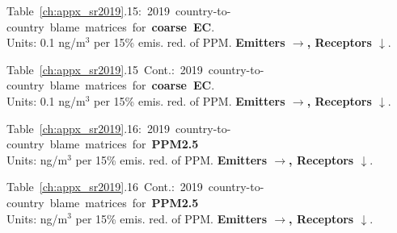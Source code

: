 \footnotesize{\mbox{Table \ref{ch:appx_sr2019}.15: 2019
    country-to-country blame matrices for \textbf{coarse
      EC}.}\\ Units: 0.1 ng/m$^3$ per 15\% emis. red. of PPM. \textbf{Emitters $\rightarrow$, Receptors $\downarrow$}. }\\[\baselineskip]\enlargethispage{\myenlarge} \hspace{-0.5cm} 
\centerline{}\clearpage
\footnotesize{\mbox{Table \ref{ch:appx_sr2019}.15 Cont.: 2019
    country-to-country blame matrices for \textbf{coarse
      EC}.}\\ Units: 0.1 ng/m$^3$ per 15\% emis. red. of PPM. \textbf{Emitters $\rightarrow$, Receptors $\downarrow$}. }\\[\baselineskip]\enlargethispage{\myenlarge} \hspace{-0.5cm} 
\centerline{}\clearpage



\footnotesize{\mbox{Table \ref{ch:appx_sr2019}.16: 2019 country-to-country blame matrices for \textbf{PPM2.5}}\\ Units: ng/m$^3$ per 15\% emis. red. of PPM. \textbf{Emitters $\rightarrow$, Receptors $\downarrow$}. }\\[\baselineskip]\enlargethispage{\myenlarge} \hspace{-0.5cm} 
\centerline{}\clearpage
\footnotesize{\mbox{Table \ref{ch:appx_sr2019}.16 Cont.: 2019 country-to-country blame matrices for \textbf{PPM2.5}}\\ Units: ng/m$^3$ per 15\% emis. red. of PPM. \textbf{Emitters $\rightarrow$, Receptors $\downarrow$}. }\\[\baselineskip]\enlargethispage{\myenlarge} \hspace{-0.5cm} 
\centerline{}\clearpage




\setlength{\parindent}{\previousparindent}
\setlength{\headsep}{\previousheadsep}

\normalsize

\cleardoublepage

